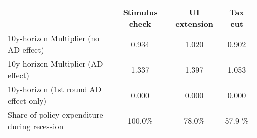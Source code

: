 \begin{tabular}{@{}lccc@{}} 
\toprule 
& Stimulus check    & UI extension    & Tax cut     \\  \midrule 
10y-horizon Multiplier (no AD effect) &0.934  & 1.020  & 0.902     \\ 
10y-horizon Multiplier (AD effect) &1.337  & 1.397  & 1.053     \\ 
10y-horizon (1st round AD effect only) &0.000  & 0.000  & 0.000     \\ 
Share of policy expenditure during recession &100.0\%  & 78.0\%  & 57.9 \%    \\ 
\end{tabular}  
